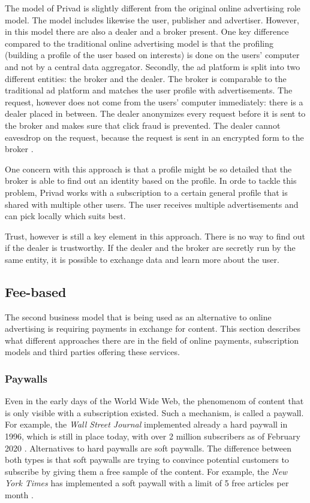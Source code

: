 The model of Privad is slightly different from the original online advertising role model. The model includes likewise the user, publisher and advertiser. However, in this model there are also a dealer and a broker present. One key difference compared to the traditional online advertising model is that the profiling (building a profile of the user based on interests) is done on the users' computer and not by a central data aggregator. Secondly, the ad platform is split into two different entities: the broker and the dealer. The broker is comparable to the traditional ad platform and matches the user profile with advertisements. The request, however does not come from the users' computer immediately: there is a dealer placed in between. The dealer anonymizes every request before it is sent to the broker and makes sure that click fraud is prevented. The dealer cannot eavesdrop on the request, because the request is sent in an encrypted form to the broker \cite{guha2011privad}. 

One concern with this approach is that a profile might be so detailed that the broker is able to find out an identity based on the profile. In orde to tackle this problem, Privad works with a subscription to a certain general profile that is shared with multiple other users. The user receives multiple advertisements and can pick locally which suits best.

Trust, however is still a key element in this approach. There is no way to find out if the dealer is trustworthy. If the dealer and the broker are secretly run by the same entity, it is possible to exchange data and learn more about the user. 

\subsection{Fee-based}

The second business model that is being used as an alternative to online advertising is requiring payments in exchange for content. This section describes what different approaches there are in the field of online payments, subscription models and third parties offering these services.

\subsubsection{Paywalls}

Even in the early days of the World Wide Web, the phenomenom of content that is only visible with a subscription existed. Such a mechanism, is called a paywall. For example, the \textit{Wall Street Journal} implemented already a hard paywall in 1996, which is still in place today, with over 2 million subscribers as of February 2020 \cite{firstpaywall}. 
Alternatives to hard paywalls are soft paywalls. The difference between both types is that soft paywalls are trying to convince potential customers to subscribe by giving them a free sample of the content. For example, the \textit{New York Times} has implemented a soft paywall with a limit of 5 free articles per month \cite{cook2012paying}.

